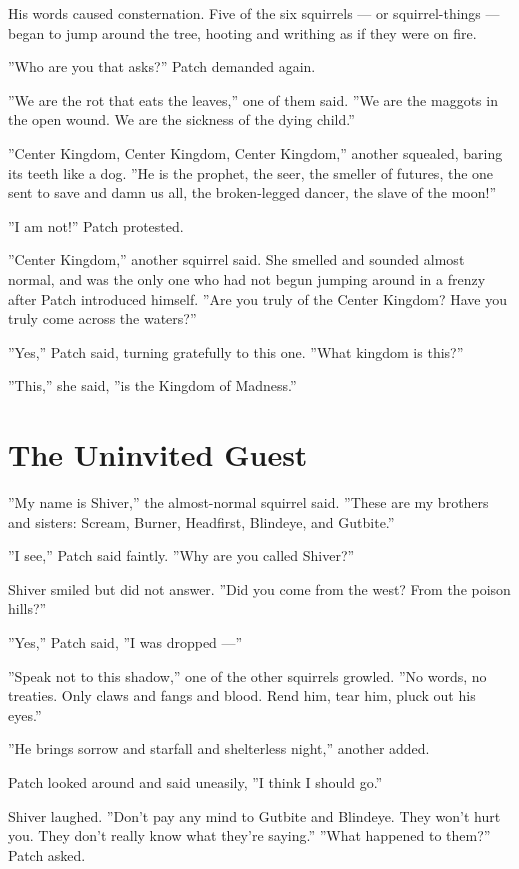 \documentclass[12pt]{book}
\begin{document}
His words caused consternation. Five of the six squirrels --- or
squirrel-things --- began to jump around the tree, hooting and
writhing as if they were on fire.

''Who are you that asks?'' Patch demanded again.

''We are the rot that eats the leaves,'' one of them said. ''We are
the maggots in the open wound. We are the sickness of the dying
child.''

''Center Kingdom, Center Kingdom, Center Kingdom,'' another squealed,
baring its teeth like a dog. ''He is the prophet, the seer, the
smeller of futures, the one sent to save and damn us all, the
broken-legged dancer, the slave of the moon!''

''I am not!'' Patch protested.

''Center Kingdom,'' another squirrel said. She smelled and sounded
almost normal, and was the only one who had not begun jumping around
in a frenzy after Patch introduced himself. ''Are you truly of the
Center Kingdom? Have you truly come across the waters?''

''Yes,'' Patch said, turning gratefully to this one. ''What kingdom is
this?''

''This,'' she said, ''is the Kingdom of Madness.''


\section{The Uninvited Guest}

''My name is Shiver,'' the almost-normal squirrel said. ''These are my
brothers and sisters: Scream, Burner, Headfirst, Blindeye, and
Gutbite.''

''I see,'' Patch said faintly. ''Why are you called Shiver?''

Shiver smiled but did not answer. ''Did you come from the west? From
the poison hills?''

''Yes,'' Patch said, ''I was dropped ---''

''Speak not to this shadow,'' one of the other squirrels growled. ''No
words, no treaties. Only claws and fangs and blood. Rend him, tear
him, pluck out his eyes.''

''He brings sorrow and starfall and shelterless night,'' another
added.

Patch looked around and said uneasily, ''I think I should go.''

Shiver laughed. ''Don't pay any mind to Gutbite and Blindeye. They
won't hurt you. They don't really know what they're saying.'' ''What
happened to them?'' Patch asked.
\end{document}
